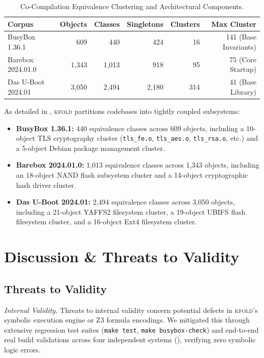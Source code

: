 \documentclass[acmsmall,screen,review]{acmart}
\newcommand{\tool}{\textsc{kfold}\xspace}
\begin{document}
\begin{table}[t]
\centering
\footnotesize
\setlength{\tabcolsep}{4pt}
\caption{Co-Compilation Equivalence Clustering and Architectural Components.}
\label{tab:clustering}
\begin{tabular}{lrrrrr}
\toprule
\textbf{Corpus} & \textbf{Objects} & \textbf{Classes} & \textbf{Singletons} & \textbf{Clusters} & \textbf{Max Cluster} \\
\midrule
BusyBox 1.36.1 & 609 & 440 & 424 & 16 & 141 (Base Invariants) \\
Barebox 2024.01.0 & 1,343 & 1,013 & 918 & 95 & 75 (Core Startup) \\
Das U-Boot 2024.01 & 3,050 & 2,494 & 2,180 & 314 & 41 (Base Library) \\
\bottomrule
\end{tabular}
\end{table}

As detailed in , \tool partitions codebases into tightly coupled subsystems:
\begin{itemize}
\item \textbf{BusyBox 1.36.1:} 440 equivalence classes across 609 objects, including a 10-object TLS cryptography cluster (\texttt{tls\_fe.o}, \texttt{tls\_aes.o}, \texttt{tls\_rsa.o}, etc.) and a 5-object Debian package management cluster.
\item \textbf{Barebox 2024.01.0:} 1,013 equivalence classes across 1,343 objects, including an 18-object NAND flash subsystem cluster and a 14-object cryptographic hash driver cluster.
\item \textbf{Das U-Boot 2024.01:} 2,494 equivalence classes across 3,050 objects, including a 21-object YAFFS2 filesystem cluster, a 19-object UBIFS flash filesystem cluster, and a 16-object Ext4 filesystem cluster.
\end{itemize}

\section{Discussion \& Threats to Validity}
\label{sec:threats}

\subsection{Threats to Validity}
\label{sec:threats:validity}

\emph{Internal Validity.} Threats to internal validity concern potential defects in \tool's symbolic execution engine or Z3 formula encodings. We mitigated this through extensive regression test suites (\texttt{make test}, \texttt{make busybox-check}) and end-to-end real build validations across four independent systems (), verifying zero symbolic logic errors.
\end{document}
